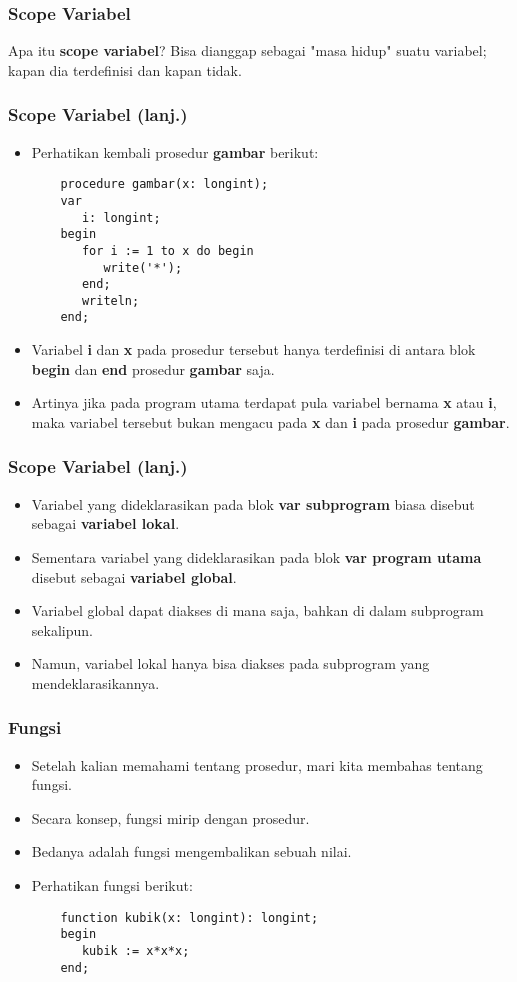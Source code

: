 \documentclass{beamer}
\begin{document}
\begin{frame}[fragile]
\frametitle{Scope Variabel}
\begin{block}{Apa itu \textbf{scope variabel}?}
Bisa dianggap sebagai "masa hidup" suatu variabel; kapan dia terdefinisi dan kapan tidak.
\end{block}
\end{frame}

\begin{frame}[fragile]
\frametitle{Scope Variabel (lanj.)}
\begin{itemize}
    \item Perhatikan kembali prosedur \textbf{gambar} berikut:
    \begin{lstlisting}
    procedure gambar(x: longint);
    var
       i: longint;
    begin
       for i := 1 to x do begin
          write('*');
       end;
       writeln;
    end;
    \end{lstlisting}
    \item Variabel \textbf{i} dan \textbf{x} pada prosedur tersebut hanya terdefinisi di antara blok \textbf{begin} dan \textbf{end} prosedur \textbf{gambar} saja.
    \item Artinya jika pada program utama terdapat pula variabel bernama \textbf{x} atau \textbf{i}, maka variabel tersebut \alert{bukan} mengacu pada \textbf{x} dan \textbf{i} pada prosedur \textbf{gambar}.
\end{itemize}
\end{frame}

\begin{frame}[fragile]
\frametitle{Scope Variabel (lanj.)}
\begin{itemize}
    \item Variabel yang dideklarasikan pada blok \textbf{var subprogram} biasa disebut sebagai \textbf{variabel lokal}.
    \item Sementara variabel yang dideklarasikan pada blok \textbf{var program utama} disebut sebagai \textbf{variabel global}.
    \item Variabel global dapat diakses di mana saja, bahkan di dalam subprogram sekalipun.
    \item Namun, variabel lokal hanya bisa diakses pada subprogram yang mendeklarasikannya.
\end{itemize}
\end{frame}

\begin{frame}[fragile]
\frametitle{Fungsi}
\begin{itemize}
    \item Setelah kalian memahami tentang prosedur, mari kita membahas tentang fungsi.
    \item Secara konsep, fungsi mirip dengan prosedur.
    \item Bedanya adalah fungsi \alert{mengembalikan sebuah nilai}.
    \item Perhatikan fungsi berikut:
    \begin{lstlisting}
    function kubik(x: longint): longint;
    begin
       kubik := x*x*x;
    end;
    \end{lstlisting}
\end{itemize}
\end{frame}
\end{document}
